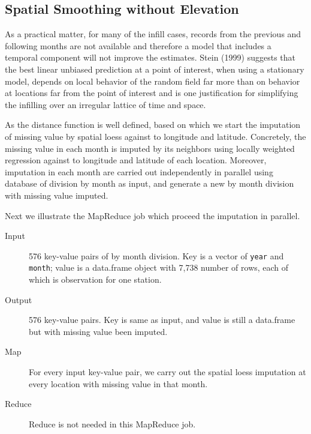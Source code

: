 \subsection{Spatial Smoothing without Elevation}
\label{sec:impute.w/o.elev}

As a practical matter, for many of the infill cases, records from the previous and
following months are not available and therefore a model that includes a temporal 
component will not improve the estimates. Stein (1999) suggests that the
best linear unbiased prediction at a point of interest, when using a stationary 
model, depends on local behavior of the random field far more than on behavior at 
locations far from the point of interest and is one justification for simplifying 
the infilling over an irregular lattice of time and space.

As the distance function is well defined, based on which we start the imputation 
of missing value by spatial loess against to longitude and latitude. Concretely,
the missing value in each month is imputed by its neighbors using locally weighted
regression against to longitude and latitude of each location. Moreover, imputation
in each month are carried out independently in parallel using database of division
by month as input, and generate a new by month division with missing value imputed.

Next we illustrate the MapReduce job which proceed the imputation in parallel.
\begin{description}
  \item[Input] 576 key-value pairs of by month division. Key is a vector of
  \texttt{year} and \texttt{month}; value is a data.frame object with 7,738 
  number of rows, each of which is observation for one station.
  \item[Output] 576 key-value pairs. Key is same as input, and value is still
  a data.frame but with missing value been imputed. 
  \item[Map]For every input key-value pair, we carry out the spatial loess 
  imputation at every location with missing value in that month. 
  \item[Reduce] Reduce is not needed in this MapReduce job.
\end{description}

